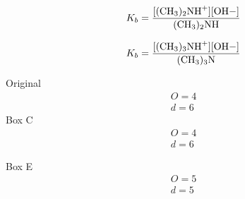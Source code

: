 \documentclass{article}  %
\begin{document}
\begin{equation*}
    \begin{aligned}
        K_b = \ce{\frac{[(CH3)2NH^+][OH-]}{(CH3)2NH}}
    \end{aligned}
\end{equation*}

\begin{equation*}
    \begin{aligned}
        K_b = \ce{\frac{[(CH3)3NH+][OH-]}{(CH3)3N}}
    \end{aligned}
\end{equation*}

Original
\begin{equation*}
    \begin{aligned}
        O = 4 \\
        d = 6 
    \end{aligned}
\end{equation*}
Box C
\begin{equation*}
    \begin{aligned}
        O = 4 \\
        d = 6 
    \end{aligned}
\end{equation*}

Box E
\begin{equation*}
    \begin{aligned}
        O = 5 \\
        d = 5 
    \end{aligned}
\end{equation*}
\end{document}
